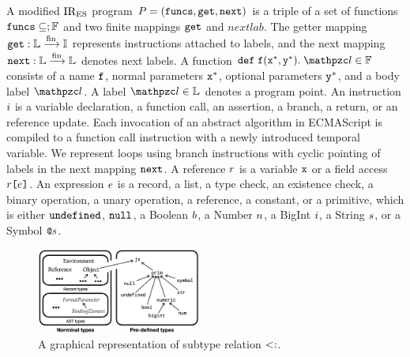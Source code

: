 A modified ${\text{IR}_\text{ES}}$ program $P = (\texttt{funcs}, \texttt{get}, \texttt{next})$ is a triple of
a set of functions $\texttt{funcs} \subseteq ; \mathbb{F}$ and two finite mappings
$\texttt{get}$ and $nextlab$.  The getter mapping $\texttt{get}: \mathbb{L} \xrightarrow{\text{fin}} \mathbb{I}$
represents instructions attached to labels, and the next mapping $\texttt{next}:
\mathbb{L} \xrightarrow{\text{fin}} \mathbb{L}$ denotes next labels.  A function $\kwdef \; \f (\x^*,
\y^*). \; \lab \in \funcset$ consists of a name $\texttt{f}$, normal parameters $\texttt{x}^*$,
optional parameters $\texttt{y}^*$, and a body label $\lab$.  A label $\lab \in \labset$
denotes a program point.  An instruction $i$ is a variable declaration, a
function call, an assertion, a branch, a return, or an reference update.  Each
invocation of an abstract algorithm in ECMAScript is compiled to a function call
instruction with a newly introduced temporal variable.  We represent loops using
branch instructions with cyclic pointing of labels in the next mapping
$\texttt{next}$.  A reference $r$ is a variable $\texttt{x}$ or a field access $r
\texttt{[} e \texttt{]}$.  An expression $e$ is a record, a list, a type check, an
existence check, a binary operation, a unary operation, a reference, a constant,
or a primitive, which is either $\texttt{undefined}$, $\texttt{null}$, a Boolean $b$, a
Number $n$, a BigInt $i$, a String $s$, or a Symbol $\texttt{@}s$.

\begin{figure}
  \centering
  \includegraphics[width=0.48\textwidth]{img/subtype}
  \vspace*{-1.5em}
  \caption{A graphical representation of subtype relation $<:$.}
  \label{fig:subtype}
  \vspace*{-1.5em}
\end{figure}

